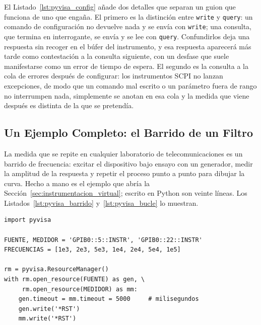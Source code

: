 El Listado~\ref{lst:pyvisa_config} añade dos detalles que separan un guion que funciona de uno que engaña. El primero es la distinción entre \texttt{write} y \texttt{query}: un comando de configuración no devuelve nada y se envía con \texttt{write}; una consulta, que termina en interrogante, se envía y se lee con \texttt{query}. Confundirlos deja una respuesta sin recoger en el búfer del instrumento, y esa respuesta aparecerá más tarde como contestación a la consulta siguiente, con un desfase que suele manifestarse como un error de tiempo de espera. El segundo es la consulta a la cola de errores después de configurar: los instrumentos SCPI no lanzan excepciones, de modo que un comando mal escrito o un parámetro fuera de rango no interrumpen nada, simplemente se anotan en esa cola y la medida que viene después es distinta de la que se pretendía.


\subsection{Un Ejemplo Completo: el Barrido de un Filtro}\label{sub:ejemplo_barrido}

La medida que se repite en cualquier laboratorio de telecomunicaciones es un barrido de frecuencia: excitar el dispositivo bajo ensayo con un generador, medir la amplitud de la respuesta y repetir el proceso punto a punto para dibujar la curva. Hecho a mano es el ejemplo que abría la Sección~\ref{sec:instrumentacion_virtual}; escrito en Python son veinte líneas. Los Listados~\ref{lst:pyvisa_barrido} y~\ref{lst:pyvisa_bucle} lo muestran.

\begin{listing}
\small
\begin{verbatim}
import pyvisa

FUENTE, MEDIDOR = 'GPIB0::5::INSTR', 'GPIB0::22::INSTR'
FRECUENCIAS = [1e3, 2e3, 5e3, 1e4, 2e4, 5e4, 1e5]

rm = pyvisa.ResourceManager()
with rm.open_resource(FUENTE) as gen, \
     rm.open_resource(MEDIDOR) as mm:
    gen.timeout = mm.timeout = 5000     # milisegundos
    gen.write('*RST')
    mm.write('*RST')
\end{verbatim}
\caption[Preparación del barrido: direcciones y apertura de las dos sesiones.]{Preparación del barrido. Las direcciones y la lista de frecuencias figuran como constantes al principio del guion, de modo que trasladarlo a otro banco es cambiar esas dos líneas; las dos sesiones se abren a la vez y se cerrarán al terminar el bloque.}\label{lst:pyvisa_barrido}
\end{listing}

